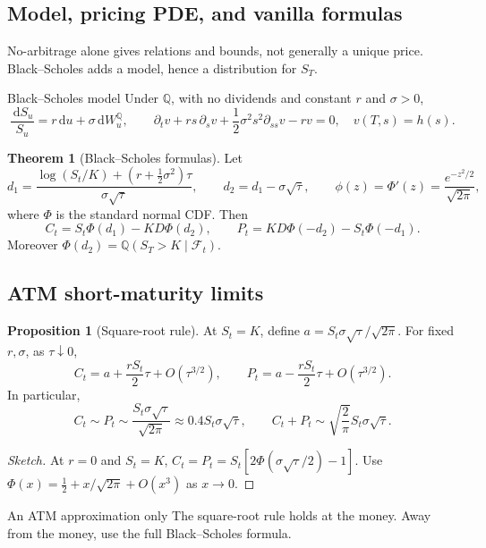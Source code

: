 \documentclass[10pt]{article}
\newcommand{\Q}{\mathbb Q}
\newcommand{\1}{\mathbf 1}
\newcommand{\cF}{\mathcal F}
\newcommand{\dd}{\,\mathrm d}
\theoremstyle{definition}
\newtheorem{proposition}[definition]{Proposition}
\newtheorem{theorem}[definition]{Theorem}
\begin{document}
\subsection{Model, pricing PDE, and vanilla formulas}

No-arbitrage alone gives relations and bounds, not generally a unique price.
Black--Scholes adds a model, hence a distribution for \(S_T\).

\begin{assumptionbox}{Black--Scholes model}
Under \(\Q\), with no dividends and constant \(r\) and \(\sigma>0\),
\[
\frac{\dd S_u}{S_u}=r\dd u+\sigma\dd W_u^{\Q},\qquad
\partial_t v+rs\,\partial_s v+\frac12\sigma^2s^2\partial_{ss}v-rv=0,
\quad v(T,s)=h(s).
\]
\end{assumptionbox}

\begin{theorem}[Black--Scholes formulas]
Let
\[
d_1=\frac{\log(S_t/K)+(r+\tfrac12\sigma^2)\tau}{\sigma\sqrt\tau},
\qquad d_2=d_1-\sigma\sqrt\tau,
\qquad \phi(z)=\Phi'(z)=\frac{e^{-z^2/2}}{\sqrt{2\pi}},
\]
where \(\Phi\) is the standard normal CDF. Then
\[
\boxed{C_t=S_t\Phi(d_1)-KD\Phi(d_2),\qquad
P_t=KD\Phi(-d_2)-S_t\Phi(-d_1).}
\]
Moreover \(\Phi(d_2)=\Q(S_T>K\mid\cF_t)\).
\end{theorem}

\subsection{ATM short-maturity limits}

\begin{proposition}[Square-root rule]
At \(S_t=K\), define \(a=S_t\sigma\sqrt\tau/\sqrt{2\pi}\). For fixed
\(r,\sigma\), as \(\tau\downarrow0\),
\[
C_t=a+\frac{rS_t}{2}\tau+O(\tau^{3/2}),\qquad
P_t=a-\frac{rS_t}{2}\tau+O(\tau^{3/2}).
\]
In particular,
\[
\boxed{C_t\sim P_t\sim\frac{S_t\sigma\sqrt\tau}{\sqrt{2\pi}}
\approx0.4S_t\sigma\sqrt\tau,\qquad
C_t+P_t\sim\sqrt{\frac2\pi}S_t\sigma\sqrt\tau.}
\]
\end{proposition}
\begin{proof}[Sketch]
At \(r=0\) and \(S_t=K\), \(C_t=P_t=S_t[2\Phi(\sigma\sqrt\tau/2)-1]\). Use
\(\Phi(x)=\tfrac12+x/\sqrt{2\pi}+O(x^3)\) as \(x\to0\).
\end{proof}

\begin{warningbox}{An ATM approximation only}
The square-root rule holds at the money. Away from the money, use the full
Black--Scholes formula.
\end{warningbox}
\end{document}
